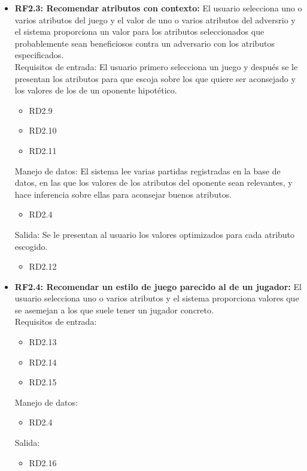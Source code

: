 \begin{itemize}
		\item \textbf{RF2.3: Recomendar atributos con contexto:}
			El usuario selecciona uno o varios atributos del juego y
			el valor de uno o varios atributos del adversrio y el sistema
			proporciona un valor para los atributos seleccionados que
			probablemente sean beneficiosos contra un adversario con
			los atributos especificados.\\

			Requisitos de entrada: El usuario primero selecciona un juego y
			después se le presentan los atributos para que escoja sobre
			los que quiere ser aconsejado y los valores de los de un
			oponente hipotético.
			\begin{itemize}
				\item RD2.9 %
				\item RD2.10 %
				\item RD2.11 %
			\end{itemize}
			Manejo de datos: El sistema lee varias partidas registradas
			en la base de datos, en las que los valores de los atributos
			del oponente sean relevantes, y hace inferencia sobre ellas para
			aconsejar buenos atributos.
			\begin{itemize}
				\item RD2.4 %
			\end{itemize}
			Salida: Se le presentan al usuario los valores optimizados
			para cada atributo escogido.
			\begin{itemize}
				\item RD2.12 %
			\end{itemize}

	\item \textbf{RF2.4: Recomendar un estilo de juego parecido al
		de un jugador:}
		El usuario selecciona uno o varios atributos y el sistema
		proporciona valores que se asemejan a los que suele tener
		un jugador concreto.\\

		Requisitos de entrada:
		\begin{itemize}
			\item RD2.13 %
			\item RD2.14 %
			\item RD2.15 %
		\end{itemize}
		Manejo de datos:
		\begin{itemize}
			\item RD2.4
		\end{itemize}
		Salida:
		\begin{itemize}
			\item RD2.16 %
		\end{itemize}

	\end{itemize}


